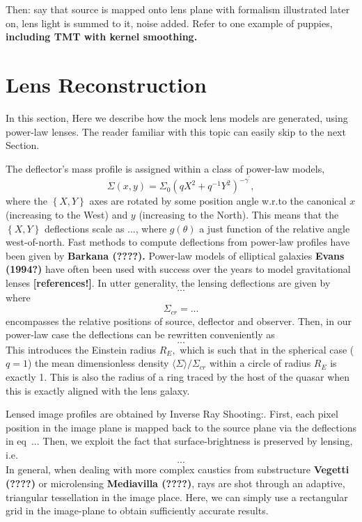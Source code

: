 \documentclass[a4paper,11pt]{article}
\begin{document}
Then: say that source is mapped onto lens plane with formalism illustrated later on, lens light is summed to it, noise added. Refer to one example of puppies, \textbf{including TMT with kernel smoothing.}

\section{Lens Reconstruction}
In this section, 
Here we describe how the mock lens models are generated, using power-law lenses. The reader familiar with this topic can easily skip to the next Section.

The deflector's mass profile is assigned within a class of power-law models,
\begin{equation}
\Sigma(x,y)=\Sigma_{0}(q X^{2}+q^{-1}Y^{2})^{-\gamma^{\prime}},
\end{equation}
where the $\left\{X,Y\right\}$ axes are rotated by some position angle w.r.to the canonical $x$ (increasing to the West) and $y$ (increasing to the North). This means that the $\left\{X,Y\right\}$ deflections scale as ..., where $g(\theta)$ a just function of the relative angle west-of-north. Fast methods to compute deflections from power-law profiles have been given by \textbf{Barkana (????).} Power-law models of elliptical galaxies \textbf{Evans (1994?)} have often been used with success over the years to model gravitational lenses \textbf{[references!]}.
In utter generality, the lensing deflections are given by
\begin{equation}
...
\end{equation}
where
\begin{equation}
\Sigma_{cr}=...
\end{equation}
encompasses the relative positions of source, deflector and observer. Then, in our power-law case the deflections can be rewritten conveniently as
\begin{equation}
...
\end{equation}
This introduces the Einstein radius $R_E,$ which is such that in the spherical case ($q=1$) the mean dimensionless density $\langle\Sigma\rangle/\Sigma_{cr}$ within a circle of radius $R_E$ is exactly 1. This is also the radius of a ring traced by the host of the quasar when this is exactly aligned with the lens galaxy.

Lensed image profiles are obtained by Inverse Ray Shooting:. First, each pixel position in the image plane is mapped back to the source plane via the deflections in eq~... Then, we exploit the fact that surface-brightness is preserved by lensing, i.e.
\begin{equation}
...
\end{equation}
In general, when dealing with more complex caustics from substructure \textbf{Vegetti (????)} or microlensing \textbf{Mediavilla (????)},
 rays are shot through an adaptive, triangular tessellation in the image place.
 Here, we can simply use a rectangular grid in the image-plane to obtain sufficiently accurate results.
\end{document}
